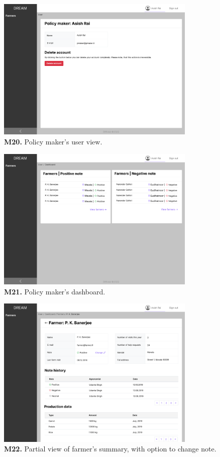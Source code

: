 \begin{figure}[H]
    \centering
    \includegraphics[width=0.85\textwidth]{mockups/Policy maker_User.png}
    \caption{\textbf{M20.} Policy maker's user view.}
\end{figure}

\begin{figure}[H]
    \centering
    \includegraphics[width=0.85\textwidth]{mockups/Policy maker_Dashboard.png}
    \caption{\textbf{M21.} Policy maker's dashboard.}
\end{figure}

\begin{figure}[H]
    \centering
    \includegraphics[width=0.85\textwidth]{mockups/Policy maker_Dashboard_Farmers_Farmer_part1.png}
    \caption{\textbf{M22.} Partial view of farmer's summary, with option to change note.}
\end{figure}
